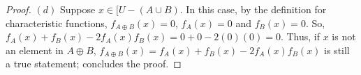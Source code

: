 \documentclass[a4paper, 12pt]{article}
\theoremstyle{plain}
\begin{document}
\begin{proof}
		\newline \newline \indent $(d)$ Suppose $x \in [U - (A \cup B)$. In this case, by the definition for \newline \indent characteristic functions, $f_{A \oplus B}(x) = 0$, $f_{A}(x) = 0$ and $f_{B}(x) = 0$. So, \indent $f_{A}(x) + f_{B}(x) - 2f_{A}(x)f_{B}(x) = 0 + 0 - 2(0)(0) = 0$.
		\newline
		\newline
		Thus, if $x$ is not an element in $A \oplus B$, $f_{A \oplus B}(x) = f_{A}(x) + f_{B}(x) - 2f_{A}(x)f_{B}(x)$ is still a true statement; concludes the proof.
	\end{proof}
\end{document}
